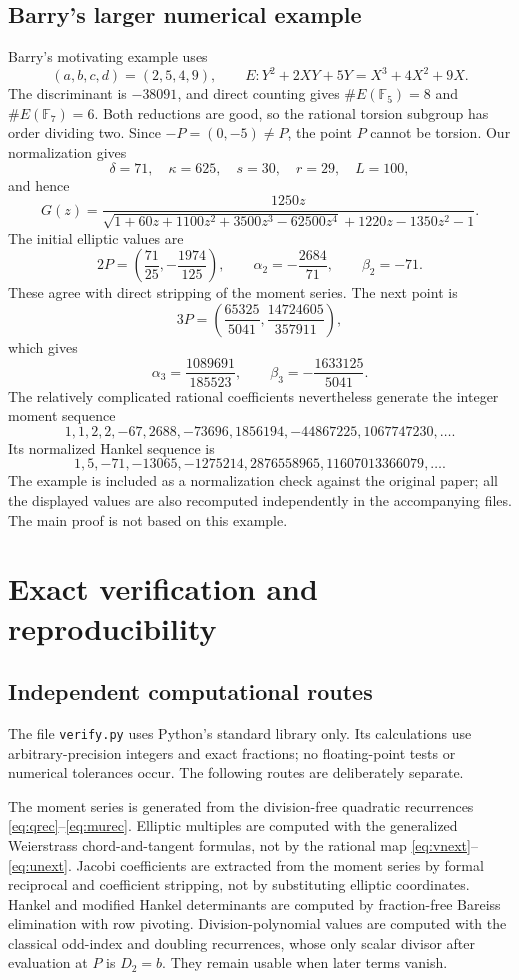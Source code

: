 \documentclass[11pt,letterpaper]{article}
\numberwithin{equation}{section}
\theoremstyle{definition}
\theoremstyle{remark}
\begin{document}
\subsection{Barry's larger numerical example}
Barry's motivating example \cite[Section~2]{Barry2023} uses
\[
 (a,b,c,d)=(2,5,4,9),\qquad
 E:Y^2+2XY+5Y=X^3+4X^2+9X.
\]
The discriminant is $-38091$, and direct counting gives
$\#E(\mathbb F_5)=8$ and $\#E(\mathbb F_7)=6$. Both reductions are good,
so the rational torsion subgroup has order dividing two. Since
$-P=(0,-5)\ne P$, the point $P$ cannot be torsion.
Our normalization gives
\[
 \delta=71,\quad\kappa=625,\quad s=30,\quad r=29,\quad L=100,
\]
and hence
\begin{equation}\label{eq:barryG}
 G(z)=\frac{1250z}
 {\sqrt{1+60z+1100z^2+3500z^3-62500z^4}
       +1220z-1350z^2-1}.
\end{equation}
The initial elliptic values are
\[
 2P=\left(\frac{71}{25},-\frac{1974}{125}\right),\qquad
 \alpha_2=-\frac{2684}{71},\qquad \beta_2=-71.
\]
These agree with direct stripping of the moment series. The next point is
\[
 3P=\left(\frac{65325}{5041},\frac{14724605}{357911}\right),
\]
which gives
\[
 \alpha_3=\frac{1089691}{185523},\qquad
 \beta_3=-\frac{1633125}{5041}.
\]
The relatively complicated rational coefficients nevertheless generate the
integer moment sequence
\[
 1,1,2,2,-67,2688,-73696,1856194,-44867225,1067747230,\ldots.
\]
Its normalized Hankel sequence is
\[
 1,5,-71,-13065,-1275214,2876558965,11607013366079,\ldots.
\]
The example is included as a normalization check against the original
paper; all the displayed values are also recomputed independently in the
accompanying files. The main proof is not based on this example.

\section{Exact verification and reproducibility}\label{sec:verification}

\subsection{Independent computational routes}
The file \texttt{verify.py} uses Python's standard library only. Its
calculations use arbitrary-precision integers and exact fractions; no
floating-point tests or numerical tolerances occur. The following routes
are deliberately separate.

The moment series is generated from the division-free quadratic
recurrences \eqref{eq:qrec}--\eqref{eq:murec}. Elliptic multiples are computed
with the generalized Weierstrass chord-and-tangent formulas, not by the
rational map \eqref{eq:vnext}--\eqref{eq:unext}. Jacobi coefficients are
extracted from the moment series by formal reciprocal and coefficient
stripping, not by substituting elliptic coordinates. Hankel and modified
Hankel determinants are computed by fraction-free Bareiss elimination with
row pivoting. Division-polynomial values are computed with the classical
odd-index and doubling recurrences, whose only scalar divisor after
evaluation at $P$ is $D_2=b$. They remain usable when later terms vanish.
\end{document}
